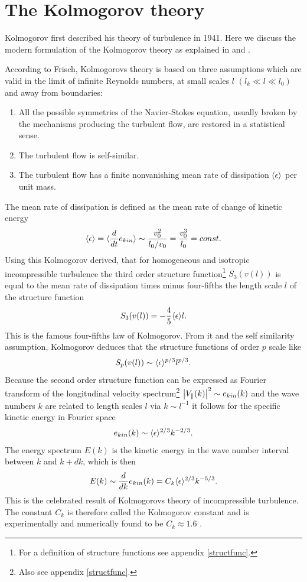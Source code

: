 \section{The Kolmogorov theory}\label{kolmo}
Kolmogorov first described his theory of turbulence in 1941. 
Here we discuss the modern formulation of the Kolmogorov theory as
explained in \citet{Frisch1995} and \citet{Pope2000}.

According to Frisch, Kolmogorovs theory is based on three
assumptions which are valid in the limit of infinite Reynolds numbers, at small
scales $l$ $(l_k \ll l \ll l_0)$ and away from boundaries:
\begin{enumerate}
\item All the possible symmetries of
the Navier-Stokes equation, usually broken by the mechanisms producing the
turbulent flow, are restored in a statistical sense.
\item The turbulent flow is self-similar.
\item The turbulent flow has a finite nonvanishing mean rate of dissipation
$\langle \epsilon \rangle$ per unit mass.
\end{enumerate}
The mean rate of dissipation is defined as the mean rate of change of kinetic
energy
\begin{align}
\langle \epsilon \rangle=\langle \frac{d}{d t}e_{kin} \rangle \sim \frac{v_0^2}{l_0/v_0} =
\frac{v_0^3}{l_0} = const. \label{eq:diss}
\end{align}
Using this Kolmogorov derived, that for homogeneous and isotropic
incompressible turbulence the third order structure function\footnote{For a
definition of structure functions see
appendix \ref{structfunc}.} $S_3(v(l))$ is equal
to the mean rate of dissipation times minus four-fifths the length scale $l$ of
the structure function
\begin{align}
S_3(v(l)) = -\frac{4}{5} \langle \epsilon \rangle l.
\end{align}
This is the famous four-fifths law of Kolmogorov. From
it and the self similarity assumption, Kolmogorov deduces that the structure
functions of order $p$ scale like
\begin{align}
S_p(v(l)) \sim \langle \epsilon \rangle^{p/3} l^{p/3}.
\end{align}
Because the second order structure function can be expressed as
Fourier transform of the longitudinal velocity
spectrum\footnote{Also see appendix \ref{structfunc}.} $\left\lvert V_{\parallel}(k)\right\rvert^2
\sim e_{kin}(k)$ and the wave numbers $k$ are related to length scales $l$ via
$k \sim l^{-1}$ it follows for the specific kinetic energy in Fourier space
\begin{align}
e_{kin}(k) \sim \langle \epsilon \rangle^{2/3} k^{-2/3}. 
\end{align}
The energy spectrum $E(k)$ is the kinetic energy in
the wave number interval between $k$ and $k+dk$, which is then
\begin{align}
E(k) \sim \frac{d}{d k} e_{kin}(k) = C_k \langle \epsilon \rangle^{2/3} k^{-5/3}.
\end{align}
This is the celebrated result of Kolmogorovs theory of incompressible
turbulence. The constant $C_k$ is therefore called the Kolmogorov constant and
is 
experimentally and numerically found to be $C_k \approx 1.6$
\citep{Yokokawa2002}. 

